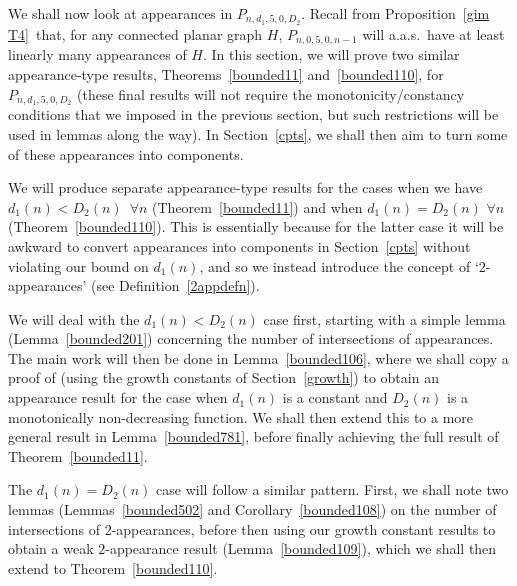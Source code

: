 \documentclass{article}
\newtheorem{Proof of Theorem}{Proof of Theorem}
\begin{document}
We shall now look at appearances in $P_{n,d_{1},5,0,D_{2}}$.
Recall from Proposition~\ref{gim T4}~that, 
for any connected planar graph $H$, 
$P_{n,0,5,0,n-1}$ will a.a.s.~have at least linearly many appearances of $H$.
In this section,
we will prove two similar appearance-type results, 
Theorems~\ref{bounded11} and~\ref{bounded110},
for $P_{n,d_{1},5,0,D_{2}}$
(these final results will not require the monotonicity/constancy conditions that we imposed 
in the previous section,
but such restrictions will be used in lemmas along the way).
In Section~\ref{cpts},
we shall then aim to turn some of these appearances into components.

We will produce separate appearance-type results for the cases when we have
$d_{1}(n) < D_{2}(n)$~$\forall n$ (Theorem~\ref{bounded11})
and when $d_{1}(n) = D_{2}(n)$ $\forall n$ (Theorem~\ref{bounded110}). 
This is essentially because for the latter case it will be awkward 
to convert appearances into components in Section~\ref{cpts}
without violating our bound on $d_{1}(n)$,
and so we instead introduce the concept of `$2$-appearances' (see Definition~\ref{2appdefn}).

We will deal with the $d_{1}(n) < D_{2}(n)$ case first,
starting with a simple lemma (Lemma~\ref{bounded201}) concerning the number of intersections of appearances.
The main work will then be done in Lemma~\ref{bounded106},
where we shall copy a proof of \cite{mcd}
(using the growth constants of Section~\ref{growth})
to obtain an appearance result for the case when 
$d_{1}(n)$ is a constant and $D_{2}(n)$ is a monotonically non-decreasing function.
We shall then extend this to a more general result in Lemma~\ref{bounded781},
before finally achieving the full result of Theorem~\ref{bounded11}.

The $d_{1}(n)=D_{2}(n)$ case will follow a similar pattern.
First, we shall note two lemmas (Lemmas~\ref{bounded502} and Corollary~\ref{bounded108})
on the number of intersections of $2$-appearances,
before then using our growth constant results to obtain a weak $2$-appearance result (Lemma~\ref{bounded109}),
which we shall then extend to Theorem~\ref{bounded110}. 
\end{document}

